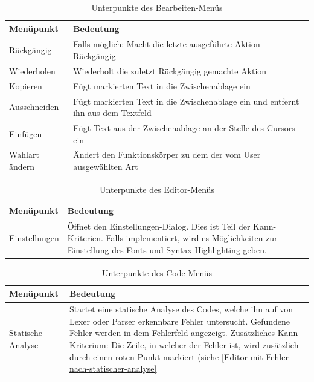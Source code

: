 \documentclass[a4paper]{scrreprt}
\begin{document}
\begin{table}[H]
\begin{tabular}{|p{3cm}|p{12cm}|}
Menüpunkt & Bedeutung \\
\hline
Rückgängig & Falls möglich: Macht die letzte ausgeführte Aktion Rückgängig \\
Wiederholen & Wiederholt die zuletzt Rückgängig gemachte Aktion \\
Kopieren & Fügt markierten Text in die Zwischenablage ein \\
Ausschneiden & Fügt markierten Text in die Zwischenablage ein und entfernt ihn aus dem Textfeld \\
Einfügen & Fügt Text aus der Zwischenablage an der Stelle des Cursors ein \\
Wahlart ändern & Ändert den Funktionskörper zu dem der vom User ausgewählten Art
\end{tabular}
\label{Bearbeiten-Menüpunkte}
\caption{Unterpunkte des Bearbeiten-Menüs}
\end{table}

\begin{table}[H]
\begin{tabular}{|p{3cm}|p{12cm}|}
Menüpunkt & Bedeutung \\
\hline
Einstellungen & Öffnet den Einstellungen-Dialog. Dies ist Teil der Kann-Kriterien. Falls implementiert, wird es Möglichkeiten zur Einstellung des Fonts und Syntax-Highlighting geben.
\end{tabular}
\label{Editor-Menüpunkte}
\caption{Unterpunkte des Editor-Menüs}
\end{table}

\begin{table}[H]
\begin{tabular}{|p{3cm}|p{12cm}|}
Menüpunkt & Bedeutung \\
\hline
Statische Analyse & Startet eine statische Analyse des Codes, welche ihn auf von Lexer oder Parser erkennbare Fehler untersucht. Gefundene Fehler werden in dem Fehlerfeld angezeigt. Zusätzliches Kann-Kriterium: Die Zeile, in welcher der Fehler ist, wird zusätzlich durch einen roten Punkt markiert (siehe \ref{Editor-mit-Fehler-nach-statischer-analyse}
\end{tabular}
\label{Editor-Menüpunkte}
\caption{Unterpunkte des Code-Menüs}
\end{table}
\end{document}

